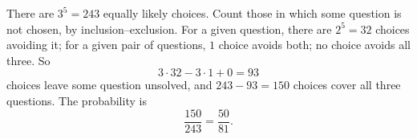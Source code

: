 There are $3^5=243$ equally likely choices. Count those in which some question is not chosen, by inclusion--exclusion. For a given question, there are $2^5=32$ choices avoiding it; for a given pair of questions, $1$ choice avoids both; no choice avoids all three. So
\[3\cdot32-3\cdot1+0=93\]
choices leave some question unsolved, and $243-93=150$ choices cover all three questions. The probability is
\[\dfrac{150}{243}=\boxed{\dfrac{50}{81}}.\]
